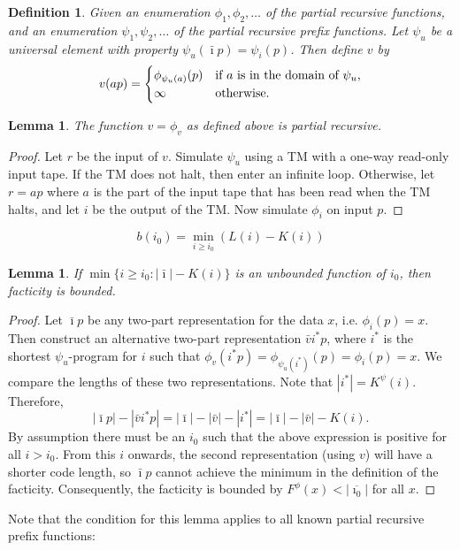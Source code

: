 \documentclass{article}
\newtheorem{lemma}[theorem]{Lemma}
\newtheorem{definition}{Definition}
\newcommand{\tn}[1]{\textnormal{#1}}
\begin{document}
\begin{definition}
Given an enumeration $\phi_1,\phi_2,\ldots$ of the partial recursive functions, and an enumeration $\psi_1,\psi_2,\ldots$ of the partial recursive prefix functions. Let $\psi_u$ be a universal element with property $\psi_u(\bar\imath p)=\psi_i(p)$. Then define $v$ by
\[
v(a p)=\begin{cases}\phi_{\psi_u(a)}(p)&\tn{if $a$ is in the domain of $\psi_u$,}\\
\infty&\tn{otherwise}.\end{cases}
\]
\end{definition}
\begin{lemma}
The function $v=\phi_v$ as defined above is partial recursive.
\end{lemma}
\begin{proof}
Let $r$ be the input of $v$. Simulate $\psi_u$ using a TM with a one-way read-only input tape. If the TM does not halt, then enter an infinite loop. Otherwise, let $r=ap$ where $a$ is the part of the input tape that has been read when the TM halts, and let $i$ be the output of the TM. Now simulate $\phi_i$ on input $p$.
\end{proof}

\[
b(i_0)=\min_{i\ge i_0}(L(i)-K(i))
\]

\begin{lemma}
  If $\min\{i\ge i_0:|\bar\imath|-K(i)\}$ is an unbounded function of $i_0$, then facticity is bounded.
\end{lemma}
\begin{proof}
Let $\bar\imath p$ be any two-part representation for the data $x$, i.e. $\phi_i(p)=x$. Then construct an alternative two-part representation $\bar vi^* p$, where $i^*$ is the shortest $\psi_u$-program for $i$ such that $\phi_v(i^* p)=\phi_{\psi_u(i^*)}(p) = \phi_i(p)=x$. We compare the lengths of these two representations. Note that $|i^*|=K^\psi(i)$. Therefore,
\[
|\bar\imath p|-|\bar v i^* p| = |\bar\imath|-|\bar v| - |i^*| = |\bar\imath|-|\bar v|-K(i).
\]
By assumption there must be an $i_0$ such that the above expression is positive for all $i>i_0$. From this $i$ onwards, the second representation (using $v$) will have a shorter code length, so $\bar\imath p$ cannot achieve the minimum in the definition of the facticity. Consequently, the facticity is bounded by $F^\phi(x)<|\overline{\imath_0}|$ for all $x$. 
\end{proof}
Note that the condition for this lemma applies to all known partial recursive prefix functions:
\end{document}
